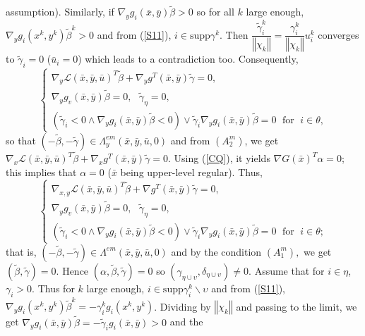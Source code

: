 	assumption). Similarly, if $\nabla_{y}g_{i}(\bar{x},\bar{y})\tilde{\beta}>0$ so
	for all $k$ large enough, $\nabla_{y}g_{i}(x^{k},y^{k})\tilde{\beta}^{k}>0$
	and from (\ref{S11}), $i\in\mathrm{supp}\gamma^{k}.$ Then $\dfrac
	{\tilde{\gamma}_{i}^{k}}{\left\Vert \chi_{k}\right\Vert }=\dfrac{\gamma
		_{i}^{k}}{\left\Vert \chi_{k}\right\Vert }u_{i}^{k}$ converges to
	$\tilde{\gamma}_{i}=0$ ($\bar{u}_{i}=0$) which leads to a contradiction too.
	Consequently,
	\[
	\left\{
	\begin{array}{l}
	\nabla_{y}\mathcal{L}(\bar{x},\bar{y},\bar{u})^{T}\tilde{\beta}+\nabla
	_{y}g^{T}(\bar{x},\bar{y})\tilde{\gamma}=0,\\
	\nabla_{y}g_{v}(\bar{x},\bar{y})\tilde{\beta}=0,\text{ \ }\tilde{\gamma}_{\eta}=0,\\
	(\tilde{\gamma}_{i}<0\wedge\nabla_{y}g_{i}(\bar{x},\bar{y})\tilde{\beta}<0)\vee\tilde{\gamma}_{i}\nabla_{y}g_{i}(\bar{x},\bar{y})\tilde{\beta
	}=0\; \mbox{ for }\; i\in\theta,
	\end{array}
	\right.
	\]
	so that $(-\tilde{\beta},-\tilde{\gamma})\in\Lambda_{y}^{em}(\bar{x},\bar
	{y},\bar{u},0)$ and from $(A_{2}^{m})$, we get
	$
	\nabla_{x}\mathcal{L}(\bar{x},\bar{y},\bar{u})^{T}\tilde{\beta}+\nabla
	_{x}g^{T}(\bar{x},\bar{y})\tilde{\gamma}=0$. Using (\ref{CQ}), it yields $\nabla G(\bar{x})^{T}\alpha=0$; this implies that $\alpha=0$ ($\bar{x}$ being upper-level regular). Thus,
	\[
	\left\{
	\begin{array}{l}
	\nabla_{x,y}\mathcal{L}(\bar{x},\bar{y},\bar{u})^{T}\tilde{\beta}+\nabla g^{T}(\bar{x},\bar{y})\tilde{\gamma}=0,\\
	\nabla_{y}g_{v}(\bar{x},\bar{y})\tilde{\beta}=0,\text{ \ }\tilde{\gamma}_{\eta}=0,\\
	(\tilde{\gamma}_{i}<0\wedge\nabla_{y}g_{i}(\bar{x},\bar{y})\tilde{\beta}<0)\vee\tilde{\gamma}_{i}\nabla_{y}g_{i}(\bar{x},\bar{y})\tilde{\beta
	}=0\; \mbox{ for }\; i\in\theta;
	\end{array}
	\right.
	\]
	that is, $(-\tilde{\beta},-\tilde{\gamma})\in\Lambda^{em}(\bar{x},\bar{y},
	\bar{u},0)$ and by the condition $(A_{1}^{m}),$ we get $(\tilde{\beta},
	\tilde{\gamma})=0.$ Hence $(\alpha,\tilde{\beta},\tilde{\gamma}
	)=0$  so
	$(\gamma_{\eta\cup\upsilon},\delta_{\eta\cup\upsilon})\neq0.$ Assume that for $i\in\eta$, $\gamma_{i}>0.$ Thus for $k$ large enough,
	$i\in\mathrm{supp}\gamma_{i}^{k}\backslash\upsilon$ and from (\ref{S11}),
	$\nabla_{y}g_{i}(x^{k},y^{k})\tilde{\beta}^{k}=
	-\gamma _{i}^{k}g_{i}(x^{k},y^{k})$. Dividing by $\left\Vert \chi_{k}\right\Vert$ and passing to the limit, we get $\nabla_{y}g_{i}(\bar{x},\bar{y})\tilde{\beta}=-\tilde{\gamma} _{i}g_{i}(\bar{x},\bar{y}) > 0$  and the
